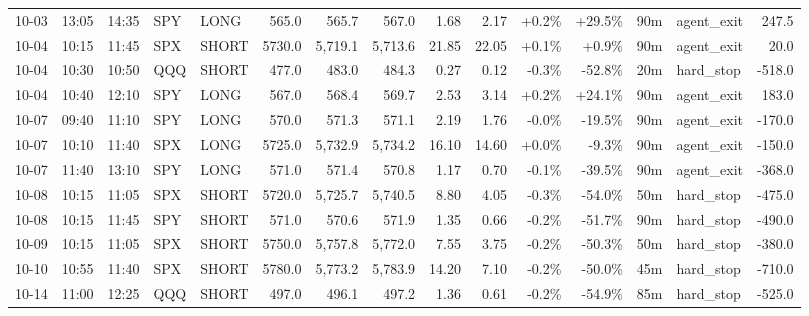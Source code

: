\documentclass[11pt,a4paper,twoside]{article}
\begin{document}
\begin{landscape}
\begin{center}
\begin{longtable}{>{\color{txtmain}}l l l l l r r r r r r r r >{\color{txtmain}}l r}
10-03 & 13:05 & 14:35 & SPY & LONG & 565.0 & 565.7 & 567.0 & 1.68 & 2.17 & \textcolor{wingreen}{+0.2\%} & \textcolor{wingreen}{+29.5\%} & 90m & agent\_exit & \textcolor{wingreen}{247.5} \\
10-04 & 10:15 & 11:45 & SPX & SHORT & 5730.0 & 5,719.1 & 5,713.6 & 21.85 & 22.05 & \textcolor{wingreen}{+0.1\%} & \textcolor{wingreen}{+0.9\%} & 90m & agent\_exit & \textcolor{wingreen}{20.0} \\
10-04 & 10:30 & 10:50 & QQQ & SHORT & 477.0 & 483.0 & 484.3 & 0.27 & 0.12 & \textcolor{lossred}{-0.3\%} & \textcolor{lossred}{-52.8\%} & 20m & hard\_stop & \textcolor{lossred}{-518.0} \\
10-04 & 10:40 & 12:10 & SPY & LONG & 567.0 & 568.4 & 569.7 & 2.53 & 3.14 & \textcolor{wingreen}{+0.2\%} & \textcolor{wingreen}{+24.1\%} & 90m & agent\_exit & \textcolor{wingreen}{183.0} \\
10-07 & 09:40 & 11:10 & SPY & LONG & 570.0 & 571.3 & 571.1 & 2.19 & 1.76 & \textcolor{lossred}{-0.0\%} & \textcolor{lossred}{-19.5\%} & 90m & agent\_exit & \textcolor{lossred}{-170.0} \\
10-07 & 10:10 & 11:40 & SPX & LONG & 5725.0 & 5,732.9 & 5,734.2 & 16.10 & 14.60 & \textcolor{wingreen}{+0.0\%} & \textcolor{lossred}{-9.3\%} & 90m & agent\_exit & \textcolor{lossred}{-150.0} \\
10-07 & 11:40 & 13:10 & SPY & LONG & 571.0 & 571.4 & 570.8 & 1.17 & 0.70 & \textcolor{lossred}{-0.1\%} & \textcolor{lossred}{-39.5\%} & 90m & agent\_exit & \textcolor{lossred}{-368.0} \\
10-08 & 10:15 & 11:05 & SPX & SHORT & 5720.0 & 5,725.7 & 5,740.5 & 8.80 & 4.05 & \textcolor{lossred}{-0.3\%} & \textcolor{lossred}{-54.0\%} & 50m & hard\_stop & \textcolor{lossred}{-475.0} \\
10-08 & 10:15 & 11:45 & SPY & SHORT & 571.0 & 570.6 & 571.9 & 1.35 & 0.66 & \textcolor{lossred}{-0.2\%} & \textcolor{lossred}{-51.7\%} & 90m & hard\_stop & \textcolor{lossred}{-490.0} \\
10-09 & 10:15 & 11:05 & SPX & SHORT & 5750.0 & 5,757.8 & 5,772.0 & 7.55 & 3.75 & \textcolor{lossred}{-0.2\%} & \textcolor{lossred}{-50.3\%} & 50m & hard\_stop & \textcolor{lossred}{-380.0} \\
10-10 & 10:55 & 11:40 & SPX & SHORT & 5780.0 & 5,773.2 & 5,783.9 & 14.20 & 7.10 & \textcolor{lossred}{-0.2\%} & \textcolor{lossred}{-50.0\%} & 45m & hard\_stop & \textcolor{lossred}{-710.0} \\
10-14 & 11:00 & 12:25 & QQQ & SHORT & 497.0 & 496.1 & 497.2 & 1.36 & 0.61 & \textcolor{lossred}{-0.2\%} & \textcolor{lossred}{-54.9\%} & 85m & hard\_stop & \textcolor{lossred}{-525.0} \\

\end{longtable}
\end{center}
\end{landscape}
\end{document}
